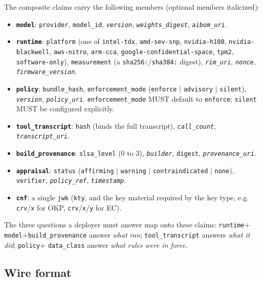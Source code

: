 The composite claims carry the following members (optional members italicized):

\begin{itemize}[leftmargin=1.5em]
  \item \textbf{\texttt{model}}: \texttt{provider}, \texttt{model\_id},
    \emph{\texttt{version}}, \emph{\texttt{weights\_digest}},
    \emph{\texttt{aibom\_uri}}.
  \item \textbf{\texttt{runtime}}: \texttt{platform} (one of \texttt{intel-tdx},
    \texttt{amd-sev-snp}, \texttt{nvidia-h100}, \texttt{nvidia-blackwell},
    \texttt{aws-nitro}, \texttt{arm-cca}, \texttt{google-confidential-space},
    \texttt{tpm2}, \texttt{software-only}), \texttt{measurement} (a
    \texttt{sha256:}/\texttt{sha384:} digest), \emph{\texttt{rim\_uri}},
    \emph{\texttt{nonce}}, \emph{\texttt{firmware\_version}}.
  \item \textbf{\texttt{policy}}: \texttt{bundle\_hash},
    \texttt{enforcement\_mode} (\texttt{enforce} $|$ \texttt{advisory} $|$
    \texttt{silent}), \emph{\texttt{version}}, \emph{\texttt{policy\_uri}}.
    \texttt{enforcement\_mode} MUST default to \texttt{enforce}; \texttt{silent}
    MUST be configured explicitly.
  \item \textbf{\texttt{tool\_transcript}}: \texttt{hash} (binds the full
    transcript), \emph{\texttt{call\_count}}, \emph{\texttt{transcript\_uri}}.
  \item \textbf{\texttt{build\_provenance}}: \texttt{slsa\_level} (0 to 3),
    \emph{\texttt{builder}}, \texttt{digest}, \emph{\texttt{provenance\_uri}}.
  \item \textbf{\texttt{appraisal}}: \texttt{status} (\texttt{affirming} $|$
    \texttt{warning} $|$ \texttt{contraindicated} $|$ \texttt{none}),
    \texttt{verifier}, \emph{\texttt{policy\_ref}}, \emph{\texttt{timestamp}}.
  \item \textbf{\texttt{cnf}}: a single \texttt{jwk} (\texttt{kty}, and the key
    material required by the key type, e.g. \texttt{crv}/\texttt{x} for OKP,
    \texttt{crv}/\texttt{x}/\texttt{y} for EC).
\end{itemize}

The three questions a deployer must answer map onto these claims:
\texttt{runtime}$+$\texttt{model}$+$\texttt{build\_provenance} answer \emph{what
ran}; \texttt{tool\_transcript} answers \emph{what it did}; \texttt{policy}$+$
\texttt{data\_class} answer \emph{what rules were in force}.

\subsection{Wire format}

